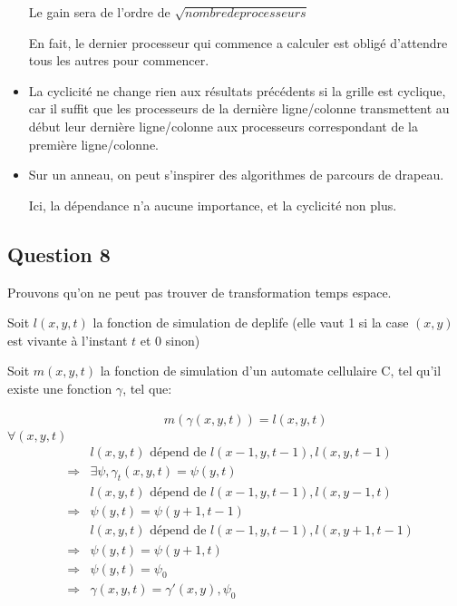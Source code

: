 \documentclass{article}
\begin{document}
\begin{itemize}
Le gain sera de l'ordre de $\sqrt{nombre de processeurs}$

En fait, le dernier processeur qui commence a calculer est obligé d'attendre tous les autres pour commencer.

\item

La cyclicité ne change rien aux résultats précédents si la grille est cyclique, car il suffit que les processeurs de la dernière ligne/colonne transmettent au début leur dernière ligne/colonne
aux processeurs correspondant de la première ligne/colonne.

\item

Sur un anneau, on peut s'inspirer des algorithmes de parcours de drapeau.

Ici, la dépendance n'a aucune importance, et la cyclicité non plus.

\end{itemize}


\subsection*{Question 8}

Prouvons qu'on ne peut pas trouver de transformation temps espace.

Soit $l(x,y,t)$ la fonction de simulation de deplife (elle vaut 1 si la case $(x,y)$ est vivante à l'instant $t$ et 0 sinon)

Soit $m(x,y,t)$ la fonction de simulation d'un automate cellulaire C, tel qu'il existe une fonction $\gamma$, tel que:

\begin{eqnarray*}
& & m(\gamma(x,y,t)) = l(x,y,t)
\end{eqnarray*}
$\forall (x,y,t)$
\begin{eqnarray*}
& & l(x,y,t) \text{ dépend de } l(x-1,y,t-1), l(x,y,t-1)\\
& \Rightarrow & \exists \psi, \gamma_t(x,y,t) = \psi(y,t)\\
& & l(x,y,t) \text{ dépend de } l(x-1,y,t-1), l(x,y-1,t)\\
& \Rightarrow & \psi(y,t) = \psi(y+1,t-1)\\
& & l(x,y,t) \text{ dépend de } l(x-1,y,t-1), l(x,y+1,t-1)\\
& \Rightarrow & \psi(y,t) = \psi(y+1,t)\\
& \Rightarrow & \psi(y,t) = \psi_0\\
& \Rightarrow & \gamma (x,y,t) = \gamma'(x,y),\psi_0\\
\end{eqnarray*}
\end{document}
